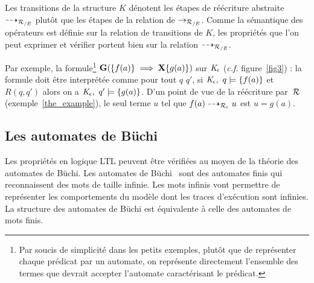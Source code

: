 Les transitions de la structure $K$ dénotent les étapes de réécriture abstraite $\dashrightarrow_{\mathcal R_{/E}}$
plutôt que les étapes de la relation de $\rightarrow_{\mathcal R_{/E}}$. Comme la sémantique des opérateurs est définie
sur la relation de transitions de $K$, les propriétés que l'on peut exprimer et vérifier portent bien
sur la relation $\dashrightarrow_{\mathcal R_{/E}}$.

Par exemple, la formule\footnote{\footnotesize Par soucis de simplicité dans les 
  petits exemples, plutôt que de représenter chaque prédicat par un automate, on représente directement 
  l'ensemble des termes que devrait accepter l'automate caractérisant le prédicat.}
  $\mathbf G(\{f(a)\} \; \Longrightarrow \; \mathbf X \{g(a)\})$ sur $\mathit K_\epsilon$ (\textit{c.f.} figure~\ref{fig3}) : la formule
doit être interprétée comme pour tout $q$ $q'$, si $\mathit K_\epsilon,\ q \models \{f(a)\}$ et $R(q, q')$ alors
on a  $\mathit K_\epsilon,\ q' \models \{g(a)\}$. D'un point de vue de la réécriture par~$\mathcal R$ (exemple~\ref{the_example}), le seul terme
$u$ tel que $f(a) \dashrightarrow_{\mathcal R_\epsilon} u$ est $u = g(a)$.


\subsection{Les automates de Büchi}


Les propriétés en logique LTL peuvent être vérifiées au moyen de la théorie des automates de Büchi.
Les automates de Büchi~\cite{Buchi} sont des automates finis qui reconnaissent des mots de taille infinie. 
Les mots infinis vont permettre de représenter les comportements du modèle dont les traces d'exécution
sont infinies. La structure des automates de Büchi est équivalente à celle des automates de mots finis.

